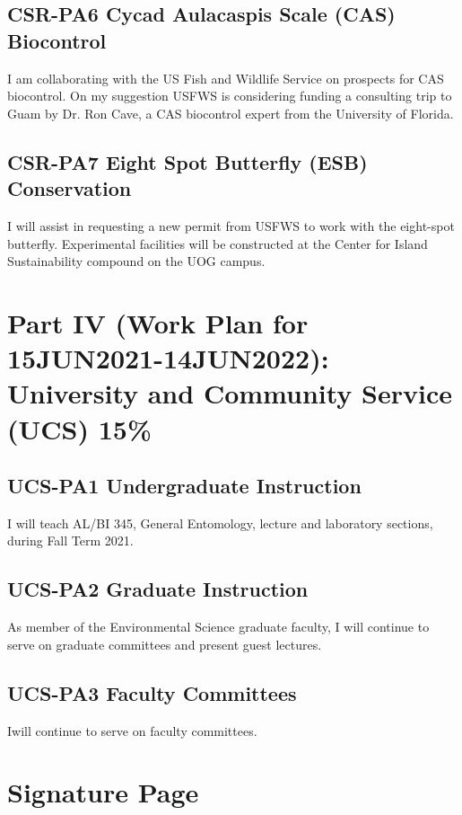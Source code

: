 \subsection{CSR-PA6 Cycad Aulacaspis Scale (CAS) Biocontrol}

I am collaborating with the US Fish and Wildlife Service on prospects for CAS biocontrol. On my suggestion USFWS is considering funding a consulting trip to Guam by Dr. Ron Cave, a CAS biocontrol expert from the University of Florida.  

\subsection{CSR-PA7 Eight Spot Butterfly (ESB) Conservation}

I will assist in requesting a new permit from USFWS to work with the eight-spot butterfly. Experimental facilities will be constructed at the Center for Island Sustainability compound on the UOG campus.

\section{Part IV (Work Plan for 15JUN2021-14JUN2022): University and Community Service (UCS) 15\%}

\subsection{UCS-PA1 Undergraduate Instruction}

I will teach AL/BI 345, General Entomology, lecture and laboratory sections, during Fall Term 2021.

\subsection{UCS-PA2 Graduate Instruction}As member of the Environmental Science graduate faculty, I will continue to serve on graduate committees and present guest lectures.

\subsection{UCS-PA3 Faculty Committees}Iwill continue to serve on faculty committees. 

\newpage	
\section{Signature Page}


